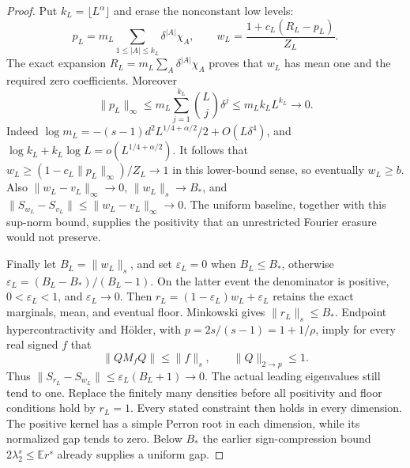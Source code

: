 \begin{proof}
Put $k_L=\lfloor L^\alpha\rfloor$ and erase the nonconstant low levels:
\[
 p_L=m_L\sum_{1\leq|A|\leq k_L}\delta^{|A|}\chi_A,\qquad
 w_L=\frac{1+c_L(R_L-p_L)}{Z_L}.
\]
The exact expansion $R_L=m_L\sum_A\delta^{|A|}\chi_A$ proves that
$w_L$ has mean one and the required zero coefficients. Moreover
\[
 \|p_L\|_\infty\leq m_L\sum_{j=1}^{k_L}\binom Lj\delta^j
 \leq m_L k_LL^{k_L}\longrightarrow0.
\]
Indeed $\log m_L=-(s-1)d^2L^{1/4+\alpha/2}/2+O(L\delta^4)$,
and $\log k_L+k_L\log L=o(L^{1/4+\alpha/2})$.
It follows that $w_L\geq(1-c_L\|p_L\|_\infty)/Z_L\to1$ in this
lower-bound sense, so eventually $w_L\geq b$. Also
$\|w_L-v_L\|_\infty\to0$, $\|w_L\|_s\to B_*$, and
$\|S_{w_L}-S_{v_L}\|\leq\|w_L-v_L\|_\infty\to0$.
The uniform baseline, together with this sup-norm bound, supplies the
positivity that an unrestricted Fourier erasure would not preserve.

Finally let $B_L=\|w_L\|_s$, and set $\varepsilon_L=0$ when
$B_L\leq B_*$, otherwise
$\varepsilon_L=(B_L-B_*)/(B_L-1)$. On the latter event the denominator
is positive, $0<\varepsilon_L<1$, and $\varepsilon_L\to0$.
Then $r_L=(1-\varepsilon_L)w_L+\varepsilon_L$ retains the exact
marginals, mean, and eventual floor. Minkowski gives $\|r_L\|_s\leq B_*$.
Endpoint hypercontractivity and H\"older, with
$p=2s/(s-1)=1+1/\rho$, imply for every real signed $f$ that
\begin{equation}\label{eq:critical-signed-322}
 \|QM_fQ\|\leq\|f\|_s,
 \qquad \|Q\|_{2\to p}\leq1.
\end{equation}
Thus $\|S_{r_L}-S_{w_L}\|\leq\varepsilon_L(B_L+1)\to0$.
The actual leading eigenvalues still tend to one. Replace the finitely
many densities before all positivity and floor conditions hold by $r_L=1$.
Every stated constraint then holds in every dimension. The positive kernel
has a simple Perron root in each dimension, while its normalized gap tends
to zero. Below $B_*$ the earlier sign-compression bound
$2\lambda_2^s\leq\mathbb E r^s$ already supplies a uniform gap.
\end{proof}

